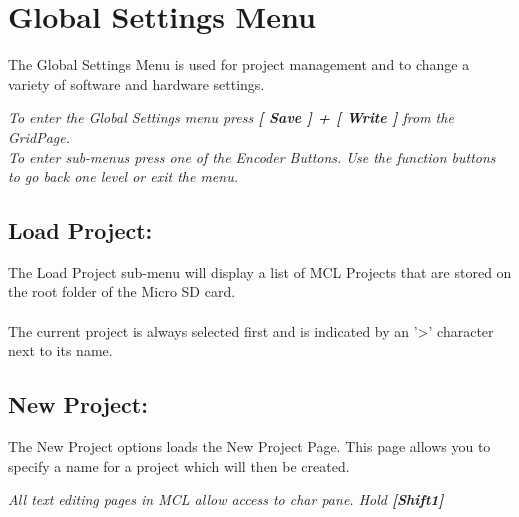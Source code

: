 \chapter{Global Settings Menu}
The Global Settings Menu is used for project management and to change a variety of software and hardware settings.


\textit{To enter the Global Settings menu press \textbf{[ Save ] + [ Write ]} from the GridPage.\\
To enter sub-menus press one of the Encoder Buttons. Use the function buttons to go back one level or exit the menu.}
\section{Load Project:}
The Load Project sub-menu will display a list of MCL Projects that are stored on the root folder of the Micro SD card.\\\\
The current project is always selected first and is indicated by an '>' character next to its name.
\newpage
\section{New Project:}
The New Project options loads the New Project Page. This page allows you to specify a name for a project which will then be created.\\

\textit{All text editing pages in MCL allow access to char pane. Hold \textbf{[Shift1]}}
